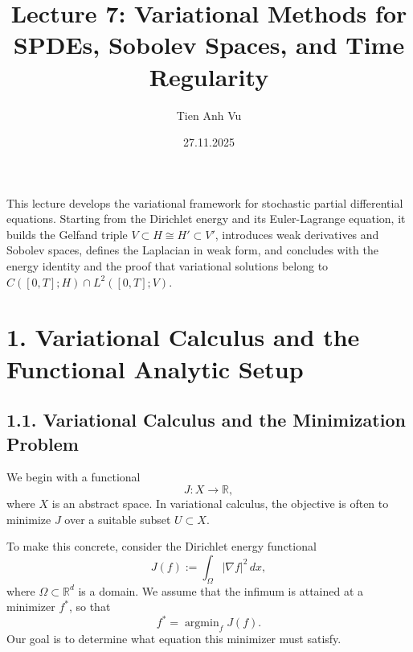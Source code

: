 \documentclass[11pt]{article}
\title{Lecture 7: Variational Methods for SPDEs, Sobolev Spaces, and Time Regularity}
\date{27.11.2025}
\author{Tien Anh Vu}
\theoremstyle{definition}
\theoremstyle{remark}
\DeclareMathOperator{\argmin}{argmin}
\begin{document}
\maketitle

This lecture develops the variational framework for stochastic partial differential equations. Starting from the Dirichlet energy and its Euler-Lagrange equation, it builds the Gelfand triple \(V\subset H\cong H'\subset V'\), introduces weak derivatives and Sobolev spaces, defines the Laplacian in weak form, and concludes with the energy identity and the proof that variational solutions belong to \(C([0,T];H)\cap L^2([0,T];V)\).

\section*{1. Variational Calculus and the Functional Analytic Setup}

\subsection*{1.1. Variational Calculus and the Minimization Problem}
We begin with a functional
\[
J:X\to \mathbb R,
\]
where \(X\) is an abstract space. In variational calculus, the objective is often to minimize \(J\) over a suitable subset \(U\subset X\).

To make this concrete, consider the Dirichlet energy functional
\[
J(f):=\int_\Omega |\nabla f|^2\,dx,
\]
where \(\Omega\subset \mathbb R^d\) is a domain. We assume that the infimum is attained at a minimizer \(f^*\), so that
\[
f^*=\argmin_f J(f).
\]
Our goal is to determine what equation this minimizer must satisfy.
\end{document}
